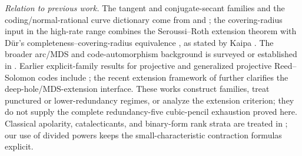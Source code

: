 \noindent\emph{Relation to previous work.}
The tangent and conjugate-secant families and the coding/normal-rational
curve dictionary come from
\cite[Prop.~1]{Kaipa2017} and
\cite[Lem.~II.4 and Thms.~I.4--I.6]{ZWK2020};
the covering-radius input in the high-rate range combines the
Seroussi--Roth extension theorem \cite[Thm.~1]{SeroussiRoth1986} with
Dür's completeness--covering-radius equivalence
\cite{Dur1994}, as stated by
Kaipa \cite[Sec.~IV and Prop.~4(1)]{Kaipa2017}.
The broader arc/MDS and code-automorphism
background is surveyed or established in
\cite{BallLavrauw2019,Dur1987}.  Earlier explicit-family results for
projective and generalized projective Reed--Solomon codes include
\cite{ZhangWan2017,XuHongXu2017,Xu2023}; the recent extension framework
of \cite{WuDingChen2023} further clarifies the deep-hole/MDS-extension
interface.  These works construct families, treat punctured or
lower-redundancy regimes, or analyze the extension criterion; they do
not supply the complete redundancy-five cubic-pencil exhaustion proved
here.  Classical apolarity, catalecticants,
and binary-form rank strata are treated in
\cite{IarrobinoKanev1999,ComasSeiguer2011}; our use of divided powers
keeps the small-characteristic contraction formulas explicit.


